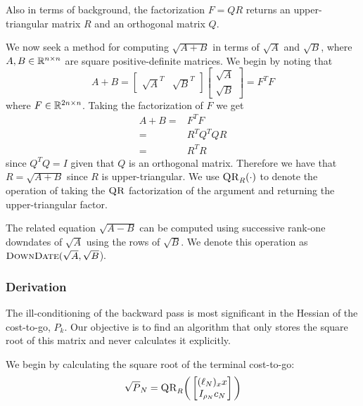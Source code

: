 \documentclass[../root.tex]{subfiles}
\begin{document}
Also in terms of background, the  factorization $F = QR$ returns
an upper-triangular matrix $R$ and an orthogonal matrix $Q$.

We now seek a method for computing $\sqrt{A+B}$ in terms of $\sqrt{A}$ and
$\sqrt{B}$, where $A,B \in \mathbb{R}^{n \times n}$ are square positive-definite
matrices. We begin by noting that
\begin{equation}
    A + B = \begin{bmatrix} \sqrt{A}^T & \sqrt{B}^T \end{bmatrix} 
    \begin{bmatrix} \sqrt{A} \\ \sqrt{B} \end{bmatrix} = F^T F
\end{equation}
where $F \in \mathbb{R}^{2n \times n}$. Taking the  factorization of $F$ we get
\begin{equation}
\begin{aligned}
    A+B =& F^T F \\
        =& R^T Q^T Q R \\
        =& R^T R
\end{aligned}
\end{equation}
since $Q^T Q = I$ given that $Q$ is an orthogonal matrix. Therefore we have
that $R = \sqrt{A+B}$ since $R$ is upper-triangular. We use
$\textproc{QR}_R(\cdot)$ to denote the operation of taking the
$\textproc{QR}$ factorization of the argument and returning the
upper-triangular factor.

The related equation $\sqrt{A-B}$ can be computed using successive rank-one
downdates of $\sqrt{A}$ using the rows of $\sqrt{B}$. We denote this
operation as $\textproc{DownDate}(\sqrt{A},\sqrt{B}$).

\subsubsection{Derivation}
The ill-conditioning of the backward pass is most significant in the Hessian of
the cost-to-go, $P_k$. Our objective is to find an algorithm that only stores
the square root of this matrix and never calculates it explicitly.

We begin by calculating the square root of the terminal cost-to-go:
\begin{equation}
    \sqrt{P}_N = \textproc{QR}_R \bigg(\begin{bmatrix} (\ell_N)_xx \\ I_{\rho_N} c_N \end{bmatrix}\bigg)
\end{equation}
\end{document}
